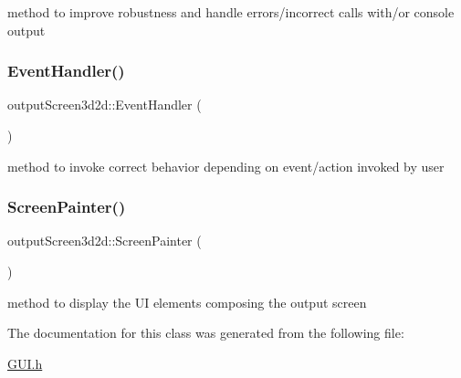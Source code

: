 method to improve robustness and handle errors/incorrect calls with/or console output \mbox{\label{classoutput_screen3d2d_a4624964767f34df730144d49676c4816}} 
\subsubsection{\texorpdfstring{Event\+Handler()}{EventHandler()}}
{\footnotesize\ttfamily output\+Screen3d2d\+::\+Event\+Handler (\begin{DoxyParamCaption}{ }\end{DoxyParamCaption})}

method to invoke correct behavior depending on event/action invoked by user \mbox{\label{classoutput_screen3d2d_aacf51b800ca899603b25faafd69611a5}} 
\subsubsection{\texorpdfstring{Screen\+Painter()}{ScreenPainter()}}
{\footnotesize\ttfamily output\+Screen3d2d\+::\+Screen\+Painter (\begin{DoxyParamCaption}{ }\end{DoxyParamCaption})}

method to display the UI elements composing the output screen 

The documentation for this class was generated from the following file\+:\begin{DoxyCompactItemize}
\item 
\mbox{\hyperlink{_g_u_i_8h}{G\+U\+I.\+h}}\end{DoxyCompactItemize}

